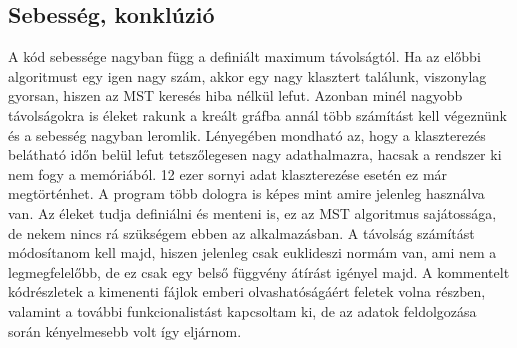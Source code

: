 \documentclass[a4paper,12pt]{article}
\begin{document}
\subsection{ Sebesség, konklúzió}
\par A kód sebessége nagyban függ a definiált maximum távolságtól. Ha az előbbi algoritmust egy igen nagy szám,
akkor egy nagy klasztert találunk, viszonylag gyorsan, hiszen az MST keresés hiba nélkül lefut. Azonban minél nagyobb távolságokra is
éleket rakunk a kreált gráfba annál több számítást kell végeznünk és a sebesség nagyban leromlik. Lényegében mondható az, hogy a
klaszterezés belátható időn belül lefut tetszőlegesen nagy adathalmazra, hacsak a rendszer ki nem fogy a memóriából. 12 ezer sornyi adat 
klaszterezése esetén ez már megtörténhet. A program több dologra is képes mint amire jelenleg használva van. Az éleket tudja definiálni és
menteni is, ez az MST algoritmus sajátossága, de nekem nincs rá szükségem ebben az alkalmazásban. A távolság számítást módosítanom kell majd,
hiszen jelenleg csak euklideszi normám van, ami nem a legmegfelelőbb, de ez csak egy belső függvény átírást igényel majd. A kommentelt kódrészletek 
a kimenenti fájlok emberi olvashatóságáért feletek volna részben, valamint a további funkcionalistást kapcsoltam ki, de az adatok feldolgozása során
 kényelmesebb volt így eljárnom.
\end{document}
